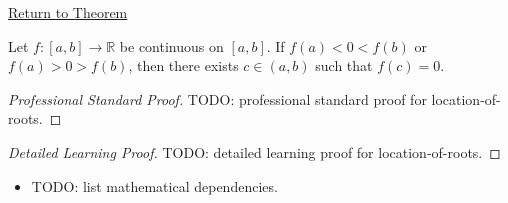 \newpage
{}
\label{prf:location-of-roots}

\begin{remark*}[Return]
\hyperref[thm:location-of-roots]{Return to Theorem}
\end{remark*}

\begin{theorem*}
Let $f : [a,b] \to \mathbb{R}$ be continuous on $[a,b]$. If $f(a) < 0 < f(b)$ or $f(a) > 0 > f(b)$, then there exists $c \in (a,b)$ such that $f(c) = 0$.
\end{theorem*}

\begin{proof}[Professional Standard Proof]
\LRAProofBodyStart
TODO: professional standard proof for location-of-roots.
\end{proof}

\begin{proof}[Detailed Learning Proof]
\LRAProofBodyStart
TODO: detailed learning proof for location-of-roots.
\end{proof}

\begin{remark*}
\end{remark*}

\begin{dependencies}
\begin{itemize}
  \item TODO: list mathematical dependencies.
\end{itemize}
\end{dependencies}

\clearpage
